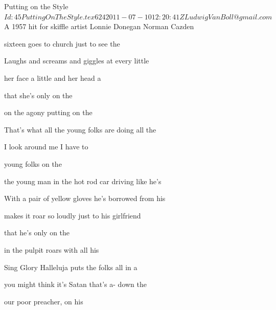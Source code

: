 \begin{SBSong}{Putting on the Style}
  {$Id: 45PuttingOnTheStyle.tex 624 2011-07-10 12:20:41Z LudwigVanBoll@gmail.com $}
  {A 1957 hit for skiffle artist Lonnie Donegan}
  {Norman Cazden}
  \begin{SBVerse}
     sixteen goes to church just to see the 

    Laughs and screams and giggles at every little 

     her face a little and  her head a  

      that she's only  on the 
  \end{SBVerse}
  \begin{SBChorus}
     on the agony putting on the 

    That's what all the young folks are doing all the 

     I look around me I  have to 

      young folks  on the 
  \end{SBChorus}
  \begin{SBVerse}
     the young man in the hot rod car driving like he's 

    With a pair of yellow gloves he's borrowed from his 

     makes it roar so loudly just to  his girlfriend  

      that he's only  on the 
  \end{SBVerse}
  \begin{SBVerse}
     in the pulpit roars with all his 

    Sing Glory Halleluja puts the folks all in a 

     you might think it's Satan that's a- down the 

      our poor preacher,  on his 
  \end{SBVerse}
\end{SBSong}
